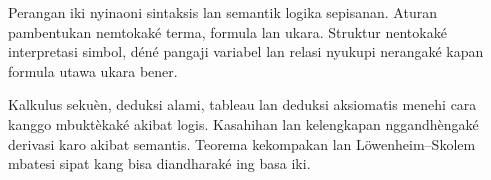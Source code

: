 \documentclass[../../include/open-logic-part]{subfiles}
\begin{document}

\begin{editorial}
  Perangan iki nyinaoni sintaksis lan semantik logika sepisanan. Aturan
  pambentukan nemtokaké terma, formula lan ukara. Struktur
  nentokaké interpretasi simbol, déné pangaji variabel lan
  relasi nyukupi nerangaké kapan formula utawa ukara bener.

  Kalkulus sekuèn, deduksi alami, tableau lan deduksi
  aksiomatis menehi cara kanggo mbuktèkaké akibat logis.
  Kasahihan lan kelengkapan nggandhèngaké derivasi karo
  akibat semantis. Teorema kekompakan lan L\"owenheim--Skolem
  mbatesi sipat kang bisa diandharaké ing basa iki.
\end{editorial}












\OLEndPartHook
\end{document}
